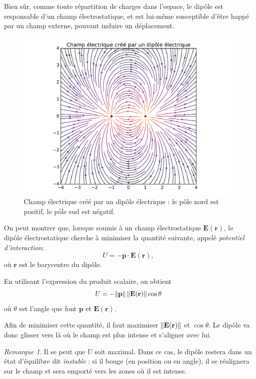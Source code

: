 \documentclass{article}
\renewcommand{\vec}[1]{\boldsymbol{\mathbf{#1}}}
\DeclarePairedDelimiter{\norm}{\lVert}{\rVert}
\theoremstyle{definition}
\theoremstyle{remark}
\newtheorem*{rem}{Remarque}
\begin{document}
Bien sûr, comme toute répartition de charges dans l'espace, le dipôle est responsable d'un champ électrostatique, et est lui-même susceptible d'être happé par un champ externe, pouvant induire un déplacement.

\begin{figure}[H]
	\centering
	\includegraphics[width=\textwidth]{parts/electrostat/Champ_dipole.pdf}
	\caption{Champ électrique créé par un dipôle électrique : le pôle nord est positif, le pôle sud est négatif.}
\end{figure}

On peut montrer que, lorsque soumis à un champ électrostatique $\vec{E}(\vec{r})$, le dipôle électrostatique cherche à minimiser la quantité suivante, appelé \textit{potentiel d'interaction}:
\[ U = -\vec{p}\cdot\vec{E}(\vec{r}), \]
où $\vec{r}$ est le barycentre du dipôle.

En utilisant l'expression du produit scalaire, on obtient
	\[ U = - \norm{\vec{p}}\,\norm{\vec{E}(\vec{r})}\cos\theta \]
où $\theta$ est l'angle que font $\vec{p}$ et $\vec{E}(\vec{r})$.

Afin de minimiser cette quantité, il faut maximiser $\norm{\vec{E}(\vec{r})}$ et $\cos\theta$. Le dipôle va donc glisser vers là où le champ est plus intense et s'aligner avec lui. 

\begin{rem}
	Il se peut que $U$ soit maximal. Dans ce cas, le dipôle restera dans un état d'équilibre dit \textit{instable} : si il bouge (en position ou en angle), il se réalignera sur le champ et sera emporté vers les zones où il est intense.
\end{rem}
\end{document}
